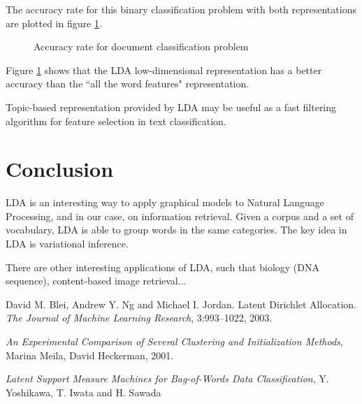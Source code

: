 \documentclass{article}
\begin{document}
The accuracy rate for this binary classification problem with both representations are plotted in figure \ref{accuracy}.

\begin{figure}[ht!]
\begin{center}
\caption{Accuracy rate for document classification problem}
\label{accuracy}
\end{center}
\end{figure}

Figure \ref{accuracy} shows that the LDA low-dimensional representation has a better accuracy than the ``all the word features" representation.

Topic-based representation provided by LDA may be useful as a fast filtering algorithm for feature selection in text classification.

\section{Conclusion}

LDA is an interesting way to apply graphical models to Natural Language Processing, and in our case, on information retrieval. Given a corpus and a set of vocabulary, LDA is able to group words in the same categories. The key idea in LDA is variational inference. 

There are other interesting applications of LDA, such that biology (DNA sequence), content-based image retrieval$\ldots$

\begin{thebibliography}{BNJ03}
 David M. Blei, Andrew Y. Ng and Michael I. Jordan. Latent Dirichlet Allocation. \emph{The Journal of Machine Learning Research}, 3:993--1022, 2003.

 \emph{An Experimental Comparison of Several Clustering and Initialization Methods}, Marina Meila, David Heckerman, 2001.

 \emph{Latent Support Measure Machines for Bag-of-Words Data Classification}, Y. Yoshikawa, T. Iwata and H. Sawada
\end{thebibliography}
\end{document}
